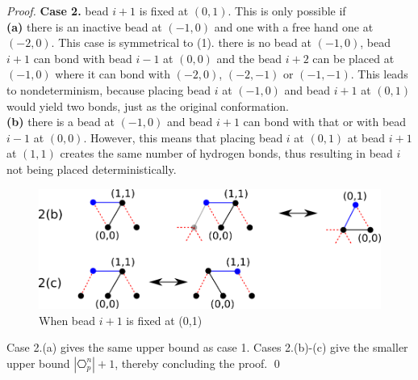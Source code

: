 \begin{proof}
\noindent\textbf{Case 2.} bead $i+1$ is fixed at $(0,1)$. This is only possible if\\
\textbf{(a)} there is an inactive bead at $(-1,0)$ and one with a free hand one at $(-2,0)$. This case is symmetrical to (1).
there is no bead at $(-1,0)$, bead $i+1$ can bond with bead $i-1$ at $(0,0)$ and the bead $i+2$ can be placed at $(-1,0)$ where it can bond with $(-2,0)$, $(-2,-1)$ or $(-1,-1)$. This leads to nondeterminism, because placing bead $i$ at $(-1,0)$ and bead $i+1$ at $(0,1)$ would yield two bonds, just as the original conformation.\\
\textbf{(b)	} there is a bead at $(-1,0)$ and bead $i+1$ can bond with that or with bead $i-1$ at $(0,0)$. However, this means that placing bead $i$ at $(0,1)$ at bead $i+1$ at $(1,1)$ creates the same number of hydrogen bonds, thus resulting in bead $i$ not being placed deterministically.
		




\begin{figure}[tb]
	\centering
	\includegraphics[width=0.8\linewidth]{./Fig/hexagonOut3n}
	
	\caption{When bead $i+1$ is fixed at (0,1)}
	\label{fig:hexagonOut3}
\end{figure}

Case 2.(a) gives the same upper bound as case 1. Cases 2.(b)-(c) give the smaller upper bound $|\hexagon_p^n|+1$, thereby concluding the proof.
\qed
\end{proof}


